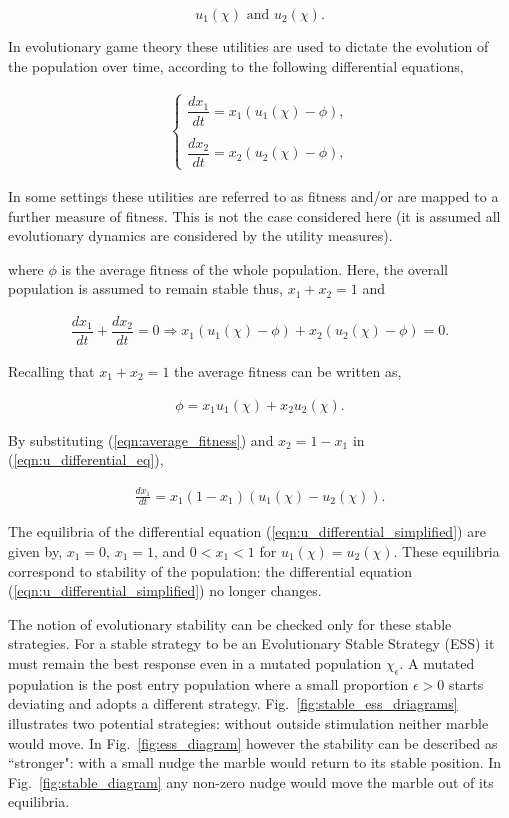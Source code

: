 \documentclass[10pt]{article}
\begin{document}
\[ u_1(\chi)  \text{ and } u_2(\chi).\]

In evolutionary game theory these utilities are used to dictate the evolution of
the population over time, according to the following differential equations,

\begin{eqnarray}
    \label{eqn:u_differential_eq}
    \left\{
    \begin{array}{cl}
    \dfrac{dx_1}{dt}=x_1(u_1(\chi)-\phi),
    \\
    \\
    \dfrac{dx_2}{dt}= x_2(u_2(\chi)-\phi),
    \end{array} \right.
\end{eqnarray}

In some settings these utilities are referred to as fitness and/or are mapped to
a further measure of fitness. This is not the case considered here (it is
assumed all evolutionary dynamics are considered by the utility measures).

where \(\phi\) is the average fitness of the whole population. Here, the overall
population is assumed to remain stable thus, \(x_1 + x_2 = 1 \) and

\begin{eqnarray}
    \dfrac{dx_1}{dt}  + \dfrac{dx_2}{dt} = 0 \Rightarrow x_1(u_1(\chi) - \phi)
     + x_2(u_2(\chi) - \phi)=0.
\end{eqnarray}

Recalling that \(x_1 + x_2 = 1\) the average fitness can be written as,

\begin{eqnarray}
\label{eqn:average_fitness}
    \phi=x_1u_1(\chi) + x_2u_2(\chi).
\end{eqnarray}

\noindent{} By substituting (\ref{eqn:average_fitness}) and \(x_2= 1 - x_1\)
in (\ref{eqn:u_differential_eq}),

\begin{eqnarray}
    \label{eqn:u_differential_simplified}
    \frac{dx_1}{dt}= x_1(1 - x_1)(u_1(\chi) - u_2(\chi)).
\end{eqnarray}

The equilibria of the differential equation (\ref{eqn:u_differential_simplified})
are given by, \(x_1=0\), \(x_1=1\), and \(0<x_1<1\) for \(u_1(\chi)=u_2(\chi)\).
These equilibria correspond to stability of the population: the differential
equation (\ref{eqn:u_differential_simplified}) no longer changes.

The notion of evolutionary stability can be checked only for these stable strategies.
For a stable strategy to be an Evolutionary Stable Strategy (ESS) it must remain
the best response even in a mutated population \(\chi_\epsilon\). A mutated population
is the post entry population
where a small proportion \(\epsilon > 0\) starts deviating and adopts a different strategy.
Fig.~\ref{fig:stable_ess_driagrams} illustrates two potential strategies: without
outside stimulation neither marble would move. In Fig.~\ref{fig:ess_diagram}
however the stability can be described as ``stronger": with a small nudge the marble
would return to its stable position. In Fig.~\ref{fig:stable_diagram} any non-zero
nudge would move the marble out of its equilibria.
\end{document}
